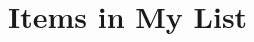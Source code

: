 \documentclass{article}
\newcommand{\mylist}{}
\newcommand{\appendtomylist}[1]{%
  \ifdefempty{\mylist}
    {\def\mylist{#1}} %
    {\edef\mylist{\mylist,#1}} %
}
\newcommand{\processmylist}{%
  \renewcommand*\do[1]{%
    Item: ##1\par
  }
  \expandafter\docsvlist\expandafter{\mylist}
}
\begin{document}
\appendtomylist{First item}
\appendtomylist{Second item}
\appendtomylist{Third item}

\section*{Items in My List}
\processmylist
\end{document}
